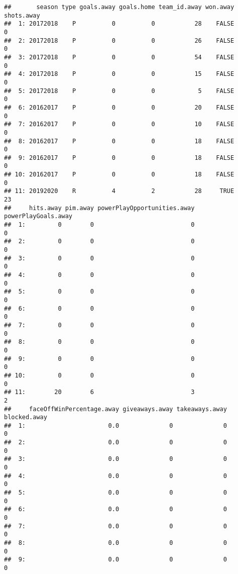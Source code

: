 \documentclass[
]{article}
\begin{document}
\begin{verbatim}
##       season type goals.away goals.home team_id.away won.away shots.away
##  1: 20172018    P          0          0           28    FALSE          0
##  2: 20172018    P          0          0           26    FALSE          0
##  3: 20172018    P          0          0           54    FALSE          0
##  4: 20172018    P          0          0           15    FALSE          0
##  5: 20172018    P          0          0            5    FALSE          0
##  6: 20162017    P          0          0           20    FALSE          0
##  7: 20162017    P          0          0           10    FALSE          0
##  8: 20162017    P          0          0           18    FALSE          0
##  9: 20162017    P          0          0           18    FALSE          0
## 10: 20162017    P          0          0           18    FALSE          0
## 11: 20192020    R          4          2           28     TRUE         23
##     hits.away pim.away powerPlayOpportunities.away powerPlayGoals.away
##  1:         0        0                           0                   0
##  2:         0        0                           0                   0
##  3:         0        0                           0                   0
##  4:         0        0                           0                   0
##  5:         0        0                           0                   0
##  6:         0        0                           0                   0
##  7:         0        0                           0                   0
##  8:         0        0                           0                   0
##  9:         0        0                           0                   0
## 10:         0        0                           0                   0
## 11:        20        6                           3                   2
##     faceOffWinPercentage.away giveaways.away takeaways.away blocked.away
##  1:                       0.0              0              0            0
##  2:                       0.0              0              0            0
##  3:                       0.0              0              0            0
##  4:                       0.0              0              0            0
##  5:                       0.0              0              0            0
##  6:                       0.0              0              0            0
##  7:                       0.0              0              0            0
##  8:                       0.0              0              0            0
##  9:                       0.0              0              0            0

\end{verbatim}
\end{document}
